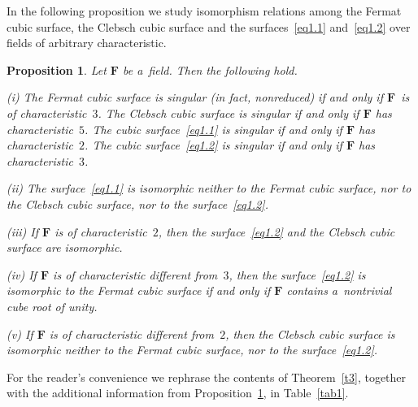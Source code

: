 \documentclass{amsart}
\numberwithin{equation}{section}
\theoremstyle{plain}
\newtheorem{proposition}{Proposition}
\theoremstyle{definition}
\theoremstyle{remark}
\begin{document}
In the following proposition we study isomorphism relations among the Fermat cubic surface, the Clebsch cubic surface and the surfaces~\eqref{eq1.1} and~\eqref{eq1.2} over fields of arbitrary characteristic.

\begin{proposition}
\label{p1}
Let $\mathbf{F}$ be a~field. Then the following hold.

{\rm (i)} The Fermat cubic surface is singular (in fact, nonreduced) if and only if\/ $\mathbf{F}$~is of characteristic~$3$. The Clebsch cubic surface is singular if and only if\/ $\mathbf{F}$ has characteristic~$5$. The cubic surface~\eqref{eq1.1} is singular if and only if\/ $\mathbf{F}$ has characteristic~$2$. The cubic surface~\eqref{eq1.2} is singular if and only if\/ $\mathbf{F}$ has characteristic~$3$.

{\rm (ii)} The surface~\eqref{eq1.1} is isomorphic neither to the Fermat cubic surface, nor to the Clebsch cubic surface, nor to the surface~\eqref{eq1.2}.

{\rm (iii)} If\/ $\mathbf{F}$ is of characteristic~$2$, then the surface~\eqref{eq1.2} and the Clebsch cubic surface are isomorphic.

{\rm (iv)} If\/ $\mathbf{F}$ is of characteristic different from~$3$, then the surface~\eqref{eq1.2} is isomorphic to the Fermat cubic surface if and only if\/ $\mathbf{F}$ contains a~nontrivial cube root of unity.

{\rm (v)} If\/ $\mathbf{F}$ is of characteristic different from~$2$, then the Clebsch cubic surface is isomorphic neither to the Fermat cubic surface, nor to the surface~\eqref{eq1.2}.
\end{proposition}

For the reader's convenience we rephrase the contents of Theorem~\ref{t3}, together with the additional information from Proposition~\ref{p1}, in Table~\ref{tab1}.
\end{document}

